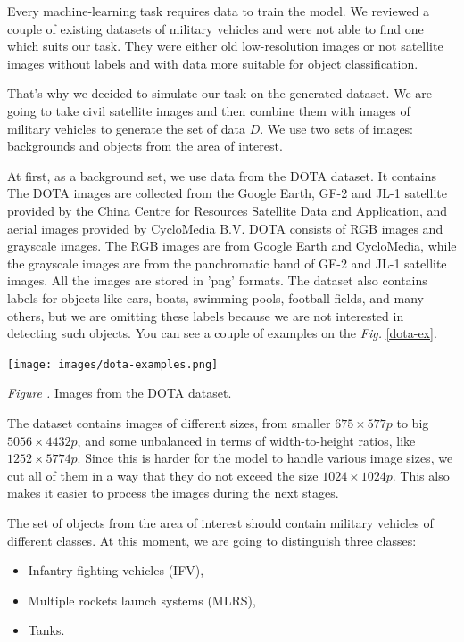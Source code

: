 \documentclass[14pt,a4paper]{extarticle}
\newcounter{e}
\newcounter{pic}
\newcommand{\pic}[1]{\refstepcounter{pic} \vspace{-0.3cm}\textit{Figure \arabic{pic}\label{#1}.}}
\newcounter{tabl}
\numberwithin{equation}{section}
\numberwithin{figure}{section}
\begin{document}
Every machine-learning task requires data to train the model. We reviewed a couple of existing datasets of military vehicles and were not able to find one which suits our task. They were either old low-resolution images or not satellite images without labels and with data more suitable for object classification.

That's why we decided to simulate our task on the generated dataset. We are going to take civil satellite images and then combine them with images of military vehicles to generate the set of data $D$. We use two sets of images: backgrounds and objects from the area of interest.

At first, as a background set, we use data from the DOTA \cite{dota} dataset. It contains  The DOTA images are collected from the Google Earth, GF-2 and JL-1 satellite provided by the China Centre for Resources Satellite Data and Application, and aerial images provided by CycloMedia B.V. DOTA consists of RGB images and grayscale images. The RGB images are from Google Earth and CycloMedia, while the grayscale images are from the panchromatic band of GF-2 and JL-1 satellite images. All the images are stored in 'png' formats. The dataset also contains labels for objects like cars, boats, swimming pools, football fields, and many others, but we are omitting these labels because we are not interested in detecting such objects. You can see a couple of examples on the \textit{Fig.} \ref{dota-ex}.

\begin{center}
    \texttt{[image: images/dota-examples.png]}
\end{center}
\begin{center}
    \pic{dota-ex} Images from the DOTA dataset.
\end{center}

The dataset contains images of different sizes, from smaller $675 \times 577p$  to big $5056 \times 4432p$, and some unbalanced in terms of width-to-height ratios, like $1252 \times 5774p$. Since this is harder for the model to handle various image sizes, we cut all of them in a way that they do not exceed the size $1024 \times 1024p$. This also makes it easier to process the images during the next stages.

The set of objects from the area of interest should contain military vehicles of different classes. At this moment, we are going to distinguish three classes:
\begin{itemize}
    \item Infantry fighting vehicles (IFV),
    \item Multiple rockets launch systems (MLRS),
    \item Tanks.
\end{itemize}
\end{document}
